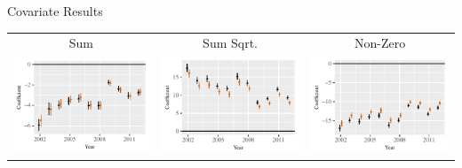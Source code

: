\documentclass{beamer}
\begin{document}
\begin{frame}{Covariate Results}

\centering
\begin{tabular}{c@{\hskip -.4cm}c@{\hskip -.4cm}c}
Sum & Sum Sqrt.  & Non-Zero  \\
\includegraphics[height=.3\textheight, clip=true, trim=.5cm .5cm 0cm .1cm]{slides_figures/rl_plots/Sum.pdf}    &
\includegraphics[height=.3\textheight, clip=true, trim=.5cm .5cm 0cm .1cm]{slides_figures/rl_plots/Sum_5.pdf}   &
\includegraphics[height=.3\textheight, clip=true, trim=.5cm .5cm 0cm .1cm]{slides_figures/rl_plots/Nonzero.pdf}\\



\end{tabular}
\end{frame}
\end{document}
